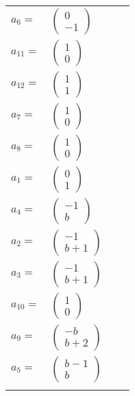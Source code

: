 \documentclass[1p]{elsarticle_modified}
\theoremstyle{definition}
\begin{document}
\begin{tabular}{m{7pt} m{180pt} m{7pt} m{180pt} }
\flushright $a_{6}=$&$\begin{pmatrix}0\\-1\end{pmatrix}$ \\
\flushright $a_{11}=$&$\begin{pmatrix}1\\0\end{pmatrix}$ \\
\flushright $a_{12}=$&$\begin{pmatrix}1\\1\end{pmatrix}$ \\
\flushright $a_{7}=$&$\begin{pmatrix}1\\0\end{pmatrix}$ \\
\flushright $a_{8}=$&$\begin{pmatrix}1\\0\end{pmatrix}$ \\
\flushright $a_{1}=$&$\begin{pmatrix}0\\1\end{pmatrix}$ \\
\flushright $a_{4}=$&$\begin{pmatrix}-1\\b\end{pmatrix}$ \\
\flushright $a_{2}=$&$\begin{pmatrix}-1\\b+1\end{pmatrix}$ \\
\flushright $a_{3}=$&$\begin{pmatrix}-1\\b+1\end{pmatrix}$ \\
\flushright $a_{10}=$&$\begin{pmatrix}1\\0\end{pmatrix}$ \\
\flushright $a_{9}=$&$\begin{pmatrix}- b\\b+2\end{pmatrix}$ \\
\flushright $a_{5}=$&$\begin{pmatrix}b-1\\b\end{pmatrix}$\\&\end{tabular}
\end{document}
